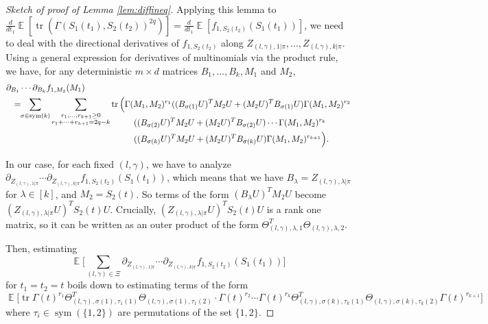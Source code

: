 \documentclass[11pt]{amsart}
\numberwithin{equation}{section}
\numberwithin{equation}{section}
\DeclareMathOperator{\E}{\mathbb{E}}
\DeclareMathOperator*{\tr}{tr}
\DeclareMathOperator{\sym}{sym}
\theoremstyle{remark}
\theoremstyle{definition}
\begin{document}
\begin{proof}[Sketch of proof of Lemma \ref{lem:diffineq}]
Applying this lemma to $\frac{d}{dt_1}\E[\tr(\Gamma(S_1(t_1),S_2(t_2))^{2q})] = \frac{d}{dt_1}\E[f_{1,S_2(t_2)}(S_1(t_1))] $, we need to deal with the directional derivatives of $f_{1,S_2(t_2)}$ along $Z_{(l,\gamma),1|\pi}, \ldots, Z_{(l,\gamma),k|\pi}$. Using a general expression for derivatives of multinomials via the product rule, we have, for any deterministic $m \times d$ matrices $B_1, \ldots, B_k, M_1$ and $M_2$,
\begin{align*}
    &\partial_{B_1} \cdots \partial_{B_k}f_{1,M_2}(M_1)
\\&\ \ =\!\!\sum_{\sigma \in \sym (k)}\sum_{\substack{r_1,\ldots,r_{k+1}\ge 0\\
	r_1+\cdots+r_{k+1}=2q-k}}
	\tr \Big(\Gamma(M_1,M_2)^{r_1}((B_{\sigma(1)}U)^TM_2U+(M_2U)^TB_{\sigma(1)}U)
	\Gamma(M_1,M_2)^{r_2}\\[-5mm]&
    \hspace{5.25cm}((B_{\sigma(2)}U)^TM_2U+(M_2U)^TB_{\sigma(2)}U)\cdots
\Gamma(M_1,M_2)^{r_k}\\&
\hspace{5.25cm}((B_{\sigma(k)}U)^TM_2U+(M_2U)^TB_{\sigma(k)}U)\Gamma(M_1,M_2)^{r_{k+1}}\Big).
\end{align*}

In our case, for each fixed $(l, \gamma)$, we have to analyze $\partial_{Z_{(l,\gamma),1|\pi}}\cdots\partial_{Z_{(l,\gamma),k|\pi}} \allowbreak f_{1,S_2(t_2)}(S_1(t_1))$, which means that we have $B_{\lambda} = Z_{(l,\gamma),\lambda|\pi}$ for $\lambda \in [k]$, and $M_2 = S_2(t)$. So terms of the form $(B_{\lambda}U)^TM_2U$ become $(Z_{(l,\gamma),\lambda|\pi}U)^TS_2(t)U$. 
Crucially, $(Z_{(l,\gamma),\lambda|\pi}U)^TS_2(t)U$ is a rank one matrix, so it can be written as an outer product of the form $\Theta_{(l, \gamma), \lambda,1}^T\Theta_{(l, \gamma), \lambda,2}$. 

Then, estimating $$\E\Bigg[ \sum_{(l,\gamma) \in \Xi}\partial_{Z_{(l,\gamma),1|\pi}}\cdots\partial_{Z_{(l,\gamma),k|\pi}}f_{1,S_2(t_2)}(S_1(t_1)) \Bigg]$$ for $t_1=t_2=t$ boils down to estimating terms of the form
\[ \E \Big[ \tr \Gamma(t)^{r_1} \Theta_{(l,\gamma), \sigma(1), \tau_1(1)}^T \Theta_{(l,\gamma), \sigma(1), \tau_1(2)} \cdot
	\Gamma(t)^{r_2} \cdots \Gamma(t)^{r_k}\Theta_{(l,\gamma), \sigma(k), \tau_k(1)}^T \Theta_{(l,\gamma), \sigma(k), \tau_k(2)} \Gamma(t)^{r_{k+1}} \Big] \]
where $\tau_i \in \sym (\{1,2\})$ are permutations of the set $\{1,2\}$.


\end{proof}
\end{document}

